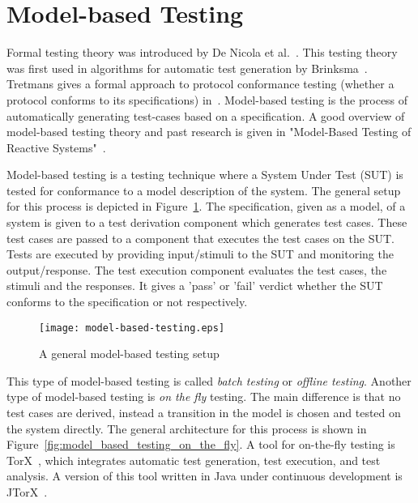 \section{Model-based Testing}\label{sec:model_based_testing}
Formal testing theory was introduced by De Nicola et al.~\cite{denicola:testing}. This testing theory was first used in algorithms for automatic test generation by Brinksma~\cite{brinksma:testing}. Tretmans gives a formal approach to protocol conformance testing (whether a protocol conforms to its specifications) in~\cite{Tretmans:conformancetesting}. Model-based testing is the process of automatically generating test-cases based on a specification. A good overview of model-based testing theory and past research is given in "Model-Based Testing of Reactive Systems"~\cite{Broy:ModelBasedTesting}. %

Model-based testing is a testing technique where a System Under Test (SUT) is tested for conformance to a model description of the system. The general setup for this process is depicted in Figure~\ref{fig:model_based_testing}. The specification, given as a model, of a system is given to a test derivation component which generates test cases. These test cases are passed to a component that executes the test cases on the SUT. Tests are executed by providing input/stimuli to the SUT and monitoring the output/response. The test execution component evaluates the test cases, the stimuli and the responses. It gives a 'pass' or 'fail' verdict whether the SUT conforms to the specification or not respectively.

\begin{figure}[h]
  \begin{center}
    \texttt{[image: model-based-testing.eps]}
  \end{center}
  \caption{A general model-based testing setup}
  \label{fig:model_based_testing}
\end{figure}

This type of model-based testing is called \textit{batch testing} or \textit{offline testing}. Another type of model-based testing is \textit{on the fly} testing. The main difference is that no test cases are derived, instead a transition in the model is chosen and tested on the system directly. The general architecture for this process is shown in Figure~\ref{fig:model_based_testing_on_the_fly}. A tool for on-the-fly testing is TorX~\cite{Tretmans:TorX}, which integrates automatic test generation, test execution, and test analysis. A version of this tool written in Java under continuous development is JTorX~\cite{Belinfante:JTorX}.

